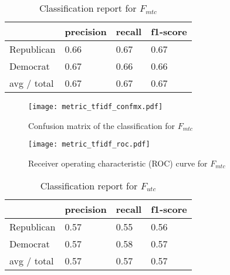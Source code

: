 \documentclass[10pt,11pt,12pt,oneside]{book}
\begin{document}
\vspace*{0.5cm}
\begin{table}[H]
	\begin{tabular}{ | p{5cm} || p{3cm} | p{3cm} | p{3cm} |}
		\hline
		& precision & recall & f1-score\\
		\hline
		Republican & 0.66 & 0.67 & 0.67\\
		\hline
		Democrat & 0.67 & 0.66 & 0.66\\  
		\hline
		avg / total  & 0.67 & 0.67 & 0.67 \\
		\hline
	\end{tabular}
	\caption{Classification report for $ F_{mtc} $}
	\label{cr_metrictfidf}
\end{table}

\begin{figure}[H]
	\begin{center}
		\texttt{[image: metric\_tfidf\_confmx.pdf]}\\
		\caption{Confusion matrix of the classification for $ F_{mtc} $}
	\end{center}
\end{figure}

\begin{figure}[H]
	\begin{center}
	\texttt{[image: metric\_tfidf\_roc.pdf]}\\
	\caption{Receiver operating characteristic (ROC) curve for $ F_{mtc} $}
	\end{center}
\end{figure}

\clearpage


\newpage
\vspace{0.5cm}
\begin{table}[H]
	\begin{tabular}{ | p{5cm} || p{3cm} | p{3cm} | p{3cm} |}
		\hline
		& precision & recall & f1-score\\
		\hline
		Republican & 0.57 & 0.55 & 0.56\\
		\hline
		Democrat & 0.57 & 0.58 & 0.57\\  
		\hline
		avg / total  & 0.57 & 0.57 & 0.57 \\
		\hline
	\end{tabular}
	\caption{Classification report for $ F_{utc} $}
	\label{cr_ultrametrictfidf}
\end{table}
\end{document}
